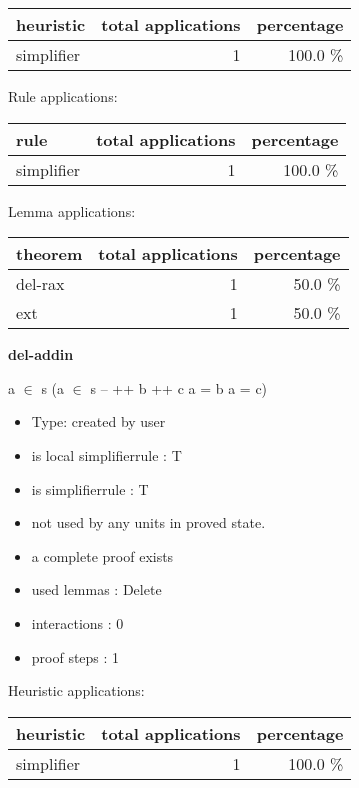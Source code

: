 \documentclass[a4paper]{article}
\begin{document}
\begin{supertabular}{l|r|r}
heuristic	& total applications & percentage \\ \hline
simplifier & 1 & 100.0 \% \\

\end{supertabular}

Rule applications:

\begin{supertabular}{l|r|r}
rule	        & total applications & percentage \\ \hline
simplifier & 1 & 100.0 \% \\

\end{supertabular}

Lemma applications:

\begin{supertabular}{l|r|r}
theorem	        & total applications & percentage \\ \hline
del-rax & 1 & 50.0 \% \\
ext & 1 & 50.0 \% \\

\end{supertabular}
\pagebreak

{\LARGE\bf del-addin}\label{lemma-del-addin}

\medskip

 \Fol \Not a $\in$ s \Imp (a $\in$ s --  ++ b ++ c \Equiv a = b \Or a = c)

\begin{itemize}

\item Type: created by user

\item is local simplifierrule : T
\item is simplifierrule : T
\item not used by any units in proved state.
\item       a complete proof exists
\item       used lemmas  : Delete
\item       interactions : 0
\item       proof steps  : 1
\end{itemize}

\medskip


Heuristic applications:

\begin{supertabular}{l|r|r}
heuristic	& total applications & percentage \\ \hline
simplifier & 1 & 100.0 \% \\

\end{supertabular}
\end{document}
